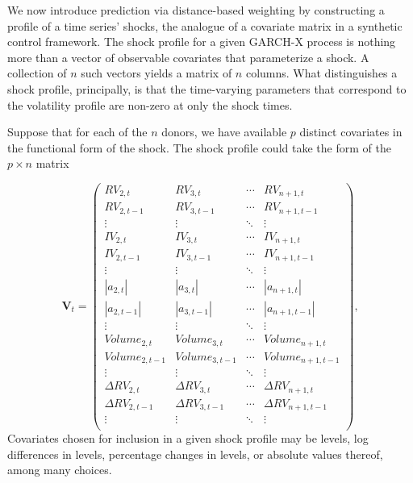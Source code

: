 \documentclass[11pt]{article}
\theoremstyle{definition}
\begin{document}
    We now introduce prediction via distance-based weighting by constructing a profile of a time series' shocks, the analogue of a covariate matrix in a synthetic control framework.  The shock profile for a given GARCH-X process is nothing more than a vector of observable covariates that parameterize a shock.  A collection of $n$ such vectors yields a matrix of $n$ columns.  What distinguishes a shock profile, principally, is that the time-varying parameters that correspond to the volatility profile are non-zero at only the shock times.  
    
    Suppose that for each of the $n$ donors, we have available $p$ distinct covariates in the functional form of the shock.  The shock profile could take the form of the $p \times n$ matrix 

    \begin{equation*}
      \textbf{V}_{t} = 
      \begin{pmatrix}

      RV_{2,t}  & RV_{3,t} &  \cdots & RV_{n+1,t}  \\
      RV_{2,t-1}  & RV_{3,t-1}  & \cdots & RV_{n+1,t-1}  \\
      \vdots  & \vdots  & \ddots & \vdots  \\
      IV_{2,t} & IV_{3,t} & \cdots & IV_{n+1,t} \\
      IV_{2,t-1}  & IV_{3,t-1}  & \cdots & IV_{n+1,t-1} \\
      \vdots  & \vdots  & \ddots & \vdots  \\
      |a_{2,t}| & |a_{3,t}| & \cdots & |a_{n+1,t}| \\
      |a_{2,t-1}|  & |a_{3,t-1}|  & \cdots & |a_{n+1,t-1}| \\
      \vdots  & \vdots  & \ddots & \vdots  \\
      Volume_{2,t}  & Volume_{3,t}  & \cdots & Volume_{n+1,t} \\
      Volume_{2,t-1}  & Volume_{3,t-1}  & \cdots & Volume_{n+1,t-1}  \\
      \vdots  & \vdots  & \ddots & \vdots  \\
      \Delta RV_{2,t} & \Delta RV_{3,t}  & \cdots & \Delta RV_{n+1,t}  \\
      \Delta RV_{2,t-1}  & \Delta RV_{3,t-1}  & \cdots & \Delta RV_{n+1,t-1}  \\
      \vdots  & \vdots  & \ddots & \vdots  \\
      \end{pmatrix},
      \end{equation*}
      Covariates chosen for inclusion in a given shock profile may be levels, log differences in levels, percentage changes in levels, or absolute values thereof, among many choices.
\end{document}
